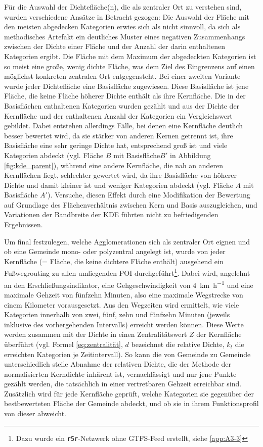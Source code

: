 \documentclass[11pt,pdftex,a4paper]{scrartcl}
\begin{document}
	Für die Auswahl der Dichtefläche(n), die als zentraler Ort zu verstehen sind, wurden verschiedene Ansätze in Betracht gezogen: Die Auswahl der Fläche mit den meisten abgedecken Kategorien erwies sich als nicht sinnvoll, da sich als methodisches Artefakt ein deutliches Muster eines negativen Zusammenhangs zwischen der Dichte einer Fläche und der Anzahl der darin enthaltenen Kategorien ergibt. Die Fläche mit dem Maximum der abgedeckten Kategorien ist so meist eine große, wenig dichte Fläche, was dem Ziel des Eingrenzens auf einen möglichst konkreten zentralen Ort entgegensteht. Bei einer zweiten Variante wurde jeder Dichtefläche eine Basisfläche zugewiesen. Diese Basisfläche ist jene Fläche, die keine Fläche höherer Dichte enthält als ihre Kernfläche. Die in der Basisflächen enthaltenen Kategorien wurden gezählt und aus der Dichte der Kernfläche und der enthaltenen Anzahl der Kategorien ein Vergleichswert gebildet. Dabei entstehen allerdings Fälle, bei denen eine Kernfläche deutlich besser bewertet wird, da sie stärker von anderen Kernen getrennt ist, ihre Basisfläche eine sehr geringe Dichte hat, entsprechend groß ist und viele Kategorien abdeckt (vgl. Fläche $B$ mit Basisfläche$B'$ in Abbildung \ref{fig:kde_parent}), während eine andere Kernfläche, die nah an anderen Kernflächen liegt, schlechter gewertet wird, da ihre Basisfläche von höherer Dichte und damit kleiner ist und weniger Kategorien abdeckt (vgl. Fläche $A$ mit Basisfläche $A'$). Versuche, diesen Effekt durch eine Modifikation der Bewertung auf Grundlage des Flächenverhältnis zwischen Kern und Basis auszugleichen, und Variationen der Bandbreite der KDE führten nicht zu befriedigenden Ergebnissen. 
	
	Um final festzulegen, welche Agglomerationen sich als zentraler Ort eignen und ob eine Gemeinde mono- oder polyzentral angelegt ist, wurde von jeder Kernfläche (= Fläche, die keine dichtere Fläche enthält) ausgehend ein Fußwegrouting zu allen umliegenden POI durchgeführt\footnote{Dazu wurde ein \texttt{r5r}-Netzwerk ohne GTFS-Feed erstellt, siehe \ref{app:A3-3}}. Dabei wird, angelehnt an den Erschließungsindikator, eine Gehgeschwindigkeit von \SI{4}{\kilo\metre\per\hour} und eine maximale Gehzeit von fünfzehn Minuten, also eine maximale Wegstrecke von einem Kilometer vorausgesetzt. Aus den Wegzeiten wird ermittelt, wie viele Kategorien innerhalb von zwei, fünf, zehn und fünfzehn Minuten (jeweils inklusive des vorhergehenden Intervalls) erreicht werden können. Diese Werte werden zusammen mit der Dichte in einen Zentralitätswert $Z$ der Kernfläche überführt (vgl. Formel \ref{eq:zentralität}, $d$ bezeichnet die relative Dichte, $k_t$ die erreichten Kategorien je Zeitintervall). So kann die von Gemeinde zu Gemeinde unterschiedlich steile Abnahme der relativen Dichte, die der Methode der normalisierten Kerndichte inhärent ist, vernachlässigt und nur jene Punkte gezählt werden, die tatsächlich in einer vertretbaren Gehzeit erreichbar sind. Zusätzlich wird für jede Kernfläche geprüft, welche Kategorien sie gegenüber der bestbewerteten Fläche der Gemeinde abdeckt, und ob sie in ihrem Funktionsprofil von dieser abweicht. 
	
\end{document}
